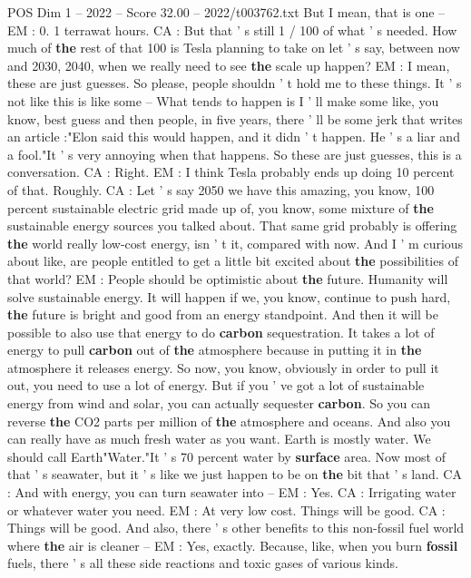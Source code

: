 \begin{textsample}{POS Dim 1 – 2022 – Score 32.00 – 2022/t003762.txt}
But I mean, that is one -- EM : 0. 1 terrawat hours.
CA : But that ' s still 1 / 100 of what ' s needed.
How much of \textbf{the} rest of that 100 is Tesla planning to take on let ' s say, between now and 2030, 2040, when we really need to see \textbf{the} scale up happen?
EM : I mean, these are just guesses.
So please, people shouldn ' t hold me to these things.
It ' s not like this is like some -- What tends to happen is I ' ll make some like, you know, best guess and then people, in five years, there ' ll be some jerk that writes an article :"Elon said this would happen, and it didn ' t happen.
He ' s a liar and a fool."It ' s very annoying when that happens.
So these are just guesses, this is a conversation.
CA : Right.
EM : I think Tesla probably ends up doing 10 percent of that.
Roughly.
CA : Let ' s say 2050 we have this amazing, you know, 100 percent sustainable electric grid made up of, you know, some mixture of \textbf{the} sustainable energy sources you talked about.
That same grid probably is offering \textbf{the} world really low-cost energy, isn ' t it, compared with now.
And I ' m curious about like, are people entitled to get a little bit excited about \textbf{the} possibilities of that world?
EM : People should be optimistic about \textbf{the} future.
Humanity will solve sustainable energy.
It will happen if we, you know, continue to push hard, \textbf{the} future is bright and good from an energy standpoint.
And then it will be possible to also use that energy to do \textbf{carbon} sequestration.
It takes a lot of energy to pull \textbf{carbon} out of \textbf{the} atmosphere because in putting it in \textbf{the} atmosphere it releases energy.
So now, you know, obviously in order to pull it out, you need to use a lot of energy.
But if you ' ve got a lot of sustainable energy from wind and solar, you can actually sequester \textbf{carbon}.
So you can reverse \textbf{the} CO2 parts per million of \textbf{the} atmosphere and oceans.
And also you can really have as much fresh water as you want.
Earth is mostly water.
We should call Earth"Water."It ' s 70 percent water by \textbf{surface} area.
Now most of that ' s seawater, but it ' s like we just happen to be on \textbf{the} bit that ' s land.
CA : And with energy, you can turn seawater into -- EM : Yes.
CA : Irrigating water or whatever water you need.
EM : At very low cost.
Things will be good.
CA : Things will be good.
And also, there ' s other benefits to this non-fossil fuel world where \textbf{the} air is cleaner -- EM : Yes, exactly.
Because, like, when you burn \textbf{fossil} fuels, there ' s all these side reactions and toxic gases of various kinds.

\end{textsample}
